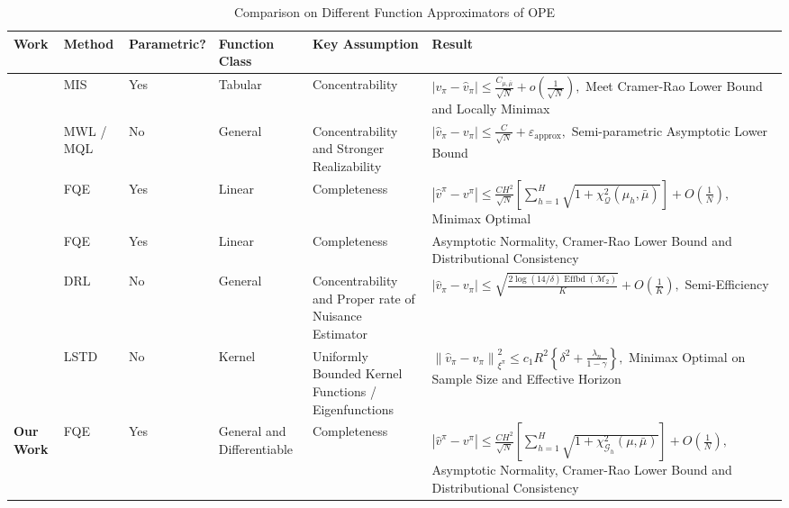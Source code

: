 \documentclass{article}
\numberwithin{equation}{section}
\theoremstyle{plain}
\theoremstyle{definition}
\theoremstyle{remark}
\begin{document}
\begin{table*}[htb!]
    \centering
    \begin{tabular}{m{2cm}<{\centering} m{2cm}<{\centering}  m{2cm}<{\centering} m{2cm}<{\centering} m{2.5cm}<{\centering} m{5cm}<{\centering}}
        \toprule
        Work & Method & Parametric? &Function Class &Key Assumption & Result\\
        \hline
        \citep{yin2020asymptotically}  & MIS & Yes & Tabular & Concentrability & $\left|v_{\pi} - \widehat{v}_{\pi}\right| \leq \frac{C_{\mu,\bar{\mu}}}{\sqrt{N}} + o(\frac{1}{\sqrt{N}}),$ Meet Cramer-Rao Lower Bound and Locally Minimax\\
        \hline
        \citep{uehara2020minimax}  & MWL / MQL & No & General & Concentrability and Stronger Realizability & $\left|\widehat{v}_{\pi} - v_{\pi}\right| \leq \frac{C}{\sqrt{N}} + \varepsilon_{\text{approx}},$ Semi-parametric Asymptotic Lower Bound \\
        \hline
        \citep{duan2020minimax}  & FQE & Yes & Linear & Completeness & $\left|\widehat{v}^{\pi}-v^{\pi}\right| \leq \frac{CH^2}{\sqrt{N}} \left[\sum_{h=1}^H \sqrt{1 + \chi^2_{\mathcal{Q}}(\mu_h,\bar{\mu})}\right] + O(\frac{1}{N}),$ Minimax Optimal\\
        \hline
        \citep{bootstrap}  & FQE & Yes & Linear & Completeness & Asymptotic Normality, Cramer-Rao Lower Bound and Distributional Consistency\\
        \hline
        \citep{kallus2020double}  & DRL & No & General & Concentrability and Proper rate of Nuisance Estimator & $\left|\widehat{v}_{\pi} - v_{\pi}\right| \leq \sqrt{\frac{2 \log (14 / \delta) \operatorname{Effbd}\left(\mathcal{M}_{2}\right)}{K}} + O(\frac{1}{K}),$ Semi-Efficiency\\
        \hline
        \citep{duan2021optimal}  & LSTD & No & Kernel & Uniformly Bounded Kernel Functions / Eigenfunctions & $\left\|\widehat{v}_{\pi}-v_{\pi}\right\|_{\xi^{\pi}}^{2} \leq c_{1} R^{2}\left\{\delta^{2}+\frac{\lambda_{n}}{1-\gamma}\right\},$ Minimax Optimal on Sample Size and Effective Horizon\\
        \hline
        \textbf{Our Work}  & FQE & Yes & General and Differentiable & Completeness & $\left|\widehat{v}^{\pi}-v^{\pi}\right| \leq \frac{CH^2}{\sqrt{N}} \left[\sum_{h=1}^H \sqrt{1 + \chi^2_{\mathcal{G}_h}(\mu,\bar{\mu})}\right] + O(\frac{1}{N}),$ Asymptotic Normality, Cramer-Rao Lower Bound and Distributional Consistency\\
        \bottomrule
    \end{tabular}
    \caption{Comparison on Different Function Approximators of OPE}
	\label{table_function_approximators} 
\end{table*}
\end{document}

